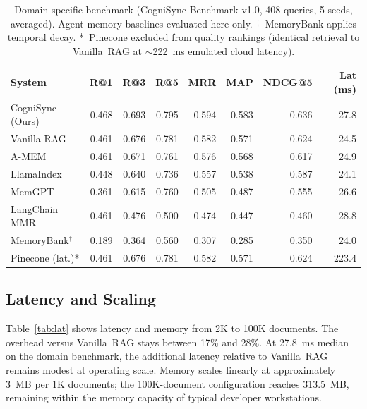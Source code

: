\documentclass[sigconf]{acmart}
\begin{document}
\begin{table}[t]
\caption{%
  Domain-specific benchmark (CogniSync Benchmark v1.0, 408 queries,
  5 seeds, averaged). Agent memory baselines evaluated here only.
  $\dagger$~MemoryBank applies temporal decay.
  *~Pinecone excluded from quality rankings (identical retrieval to
  Vanilla~RAG at $\sim$222~ms emulated cloud latency).%
}
\label{tab:main}
\begin{tabular}{lrrrrrrr}
\toprule
\textbf{System} &
  \textbf{R@1} & \textbf{R@3} & \textbf{R@5} &
  \textbf{MRR} & \textbf{MAP} & \textbf{NDCG@5} &
  \textbf{Lat (ms)} \\
\midrule
CogniSync (Ours)      & 0.468 & 0.693 & 0.795 & 0.594 & 0.583 & 0.636 & 27.8 \\
Vanilla RAG           & 0.461 & 0.676 & 0.781 & 0.582 & 0.571 & 0.624 & 24.5 \\
A-MEM                 & 0.461 & 0.671 & 0.761 & 0.576 & 0.568 & 0.617 & 24.9 \\
LlamaIndex            & 0.448 & 0.640 & 0.736 & 0.557 & 0.538 & 0.587 & 24.1 \\
MemGPT                & 0.361 & 0.615 & 0.760 & 0.505 & 0.487 & 0.555 & 26.6 \\
LangChain MMR         & 0.461 & 0.476 & 0.500 & 0.474 & 0.447 & 0.460 & 28.8 \\
MemoryBank$^\dagger$ & 0.189 & 0.364 & 0.560 & 0.307 & 0.285 & 0.350 & 24.0 \\
Pinecone (lat.)*      & 0.461 & 0.676 & 0.781 & 0.582 & 0.571 & 0.624 & 223.4 \\
\bottomrule
\end{tabular}
\end{table}

\subsection{Latency and Scaling}

Table~\ref{tab:lat} shows latency and memory from 2K to 100K documents.
The overhead versus Vanilla~RAG stays between 17\% and 28\%. At 27.8~ms median on the domain benchmark, the additional latency relative to Vanilla~RAG remains modest at operating scale. Memory scales linearly at
approximately 3~MB per 1K documents; the 100K-document configuration
reaches 313.5~MB, remaining within the memory capacity of typical developer workstations.
\end{document}
